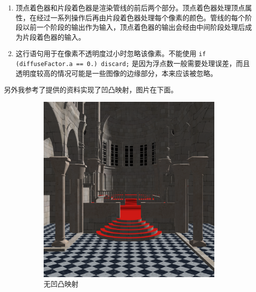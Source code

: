 \documentclass[UTF8]{ctexart}
\begin{document}
\begin{enumerate}
    \item 顶点着色器和片段着色器是渲染管线的前后两个部分。顶点着色器处理顶点属性，在经过一系列操作后再由片段着色器处理每个像素的颜色。管线的每个阶段以前一个阶段的输出作为输入，顶点着色器的输出会经由中间阶段处理后成为片段着色器的输入。
    \item 这行语句用于在像素不透明度过小时忽略该像素。不能使用 \texttt{if (diffuseFactor.a == 0.) discard;} 是因为浮点数一般需要处理误差，而且透明度较高的情况可能是一些图像的边缘部分，本来应该被忽略。
\end{enumerate}

另外我参考了提供的资料实现了凹凸映射，图片在下面。

\begin{figure}[htbp]
    \begin{subfigure}[b]{0.49\textwidth}
        \centering
        \includegraphics[width=\textwidth]{images/1-3.png}
        \caption{无凹凸映射}
    \end{subfigure}
    \hfill
    \begin{subfigure}[b]{0.49\textwidth}
        \centering

\end{subfigure}
\end{figure}
\end{document}
